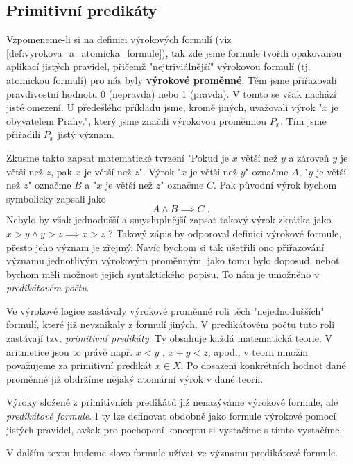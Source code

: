 \subsection{Primitivní predikáty}

Vzpomeneme-li si na definici výrokových formulí (viz \ref{def:vyrokova_a_atomicka_formule}), tak zde jsme formule tvořili opakovanou aplikací jistých pravidel, přičemž "nejtriviálnější" výrokovou formulí (tj. atomickou formulí) pro nás byly \textbf{výrokové proměnné}. Těm jsme přiřazovali pravdivostní hodnotu 0 (nepravda) nebo 1 (pravda). V tomto se však nachází jisté omezení. U předešlého příkladu jsme, kromě jiných, uvažovali výrok "$x$ je obyvatelem Prahy.", který jsme značili výrokovou proměnnou $P_x$. Tím jsme přiřadili $P_x$ jistý význam.\par
Zkusme takto zapsat matematické tvrzení "Pokud je $x$ větší než $y$ a zároveň $y$ je větší než $z$, pak $x$ je větší než $z$". Výrok "$x$ je větší než $y$" označme $A$, "$y$ je větší než $z$" označme $B$ a "$x$ je větší než $z$" označme $C$. Pak původní výrok bychom symbolicky zapsali jako
\begin{equation*}
    A \land B \implies C\; .
\end{equation*}
Nebylo by však jednodušší a smysluplnější zapsat takový výrok zkrátka jako\linebreak $x>y \land y>z \implies x>z$ ? Takový zápis by odporoval definici výrokové formule, přesto jeho význam je zřejmý. Navíc bychom si tak ušetřili ono přiřazování významu jednotlivým výrokovým proměnným, jako tomu bylo doposud, neboť bychom měli možnost jejich syntaktického popisu. To nám je umožněno v \emph{predikátovém počtu}.\par
Ve výrokové logice zastávaly výrokové proměnné roli těch "nejednodušších" formulí, které již nevznikaly z formulí jiných. V predikátovém počtu tuto roli zastávají tzv. \emph{primitivní predikáty}. Ty obsahuje každá matematická teorie. V aritmetice jsou to právě např. $x<y$ , $x+y<z$, apod., v teorii množin považujeme za primitivní predikát $x\in X$. Po dosazení konkrétních hodnot dané proměnné již obdržíme nějaký atomární výrok v dané teorii.\par
Výroky složené z primitivních predikátů již nenazýváme výrokové formule, ale \emph{predikátové formule}. I ty lze definovat obdobně jako formule výrokové pomocí jistých pravidel, avšak pro pochopení konceptu si vystačíme s tímto vystačíme.
\begin{convention}
    V dalším textu budeme slovo formule užívat ve významu predikátové formule.
\end{convention}

